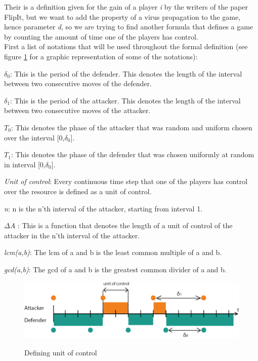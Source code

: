 Their is a definition given for the gain of a player \textit{i} by the writers of the paper FlipIt, but we want to add the property of a virus propagation to the game, hence parameter \textit{d}, so we are trying to find another formula that defines a game by counting the amount of time one of the players has control. \\

First a list of notations that will be used throughout the formal definition (see figure \ref{fig:notations} for a graphic representation of some of the notations):
\begin{description}
\item $\delta_{0}$: This is the period of the defender. This denotes the length of the interval between two consecutive moves of the defender. 
\item $\delta_{1}$: This is the period of the attacker. This denotes the length of the interval between two consecutive moves of the attacker.
\item \textit{$T_{0}$}: This denotes the phase of the attacker that was random and uniform chosen over the interval [0,$\delta_{0}$].
\item \textit{$T_{1}$}: This denotes the phase of the defender that was chosen uniformly at random in interval [0,$\delta_{0}$].
\item \textit{Unit of control}: Every continuous time step that one of the players has control over the resource is defined as a unit of control. 
\item \textit{n}: n is the n'th interval of the attacker, starting from interval 1.
\item $\Delta A$ : This is a function that denotes the length of a unit of control of the attacker in the n'th interval of the attacker.
\item \textit{lcm(a,b)}: The lcm of a and b is the least common multiple of a and b.
\item \textit{gcd(a,b)}: The gcd of a and b is the greatest common divider of a and b.
\end{description}
\begin{figure}[hbtp]
\caption{Defining unit of control}
\centering
\includegraphics[scale=1]{Images/FlipSpel.png}
\label{fig:notations}
\end{figure}


